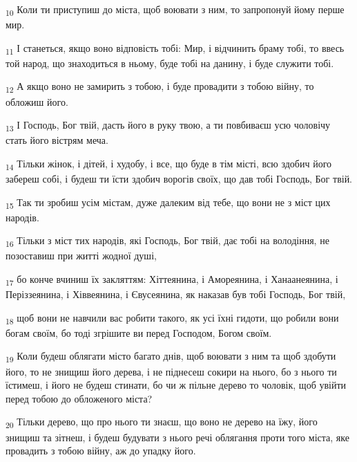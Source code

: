 \begin{tcolorbox}
\textsubscript{10} Коли ти приступиш до міста, щоб воювати з ним, то запропонуй йому перше мир.
\end{tcolorbox}
\begin{tcolorbox}
\textsubscript{11} І станеться, якщо воно відповість тобі: Мир, і відчинить браму тобі, то ввесь той народ, що знаходиться в ньому, буде тобі на данину, і буде служити тобі.
\end{tcolorbox}
\begin{tcolorbox}
\textsubscript{12} А якщо воно не замирить з тобою, і буде провадити з тобою війну, то обложиш його.
\end{tcolorbox}
\begin{tcolorbox}
\textsubscript{13} І Господь, Бог твій, дасть його в руку твою, а ти повбиваєш усю чоловічу стать його вістрям меча.
\end{tcolorbox}
\begin{tcolorbox}
\textsubscript{14} Тільки жінок, і дітей, і худобу, і все, що буде в тім місті, всю здобич його забереш собі, і будеш ти їсти здобич ворогів своїх, що дав тобі Господь, Бог твій.
\end{tcolorbox}
\begin{tcolorbox}
\textsubscript{15} Так ти зробиш усім містам, дуже далеким від тебе, що вони не з міст цих народів.
\end{tcolorbox}
\begin{tcolorbox}
\textsubscript{16} Тільки з міст тих народів, які Господь, Бог твій, дає тобі на володіння, не позоставиш при житті жодної душі,
\end{tcolorbox}
\begin{tcolorbox}
\textsubscript{17} бо конче вчиниш їх закляттям: Хіттеянина, і Амореянина, і Ханаанеянина, і Періззеянина, і Хіввеянина, і Євусеянина, як наказав був тобі Господь, Бог твій,
\end{tcolorbox}
\begin{tcolorbox}
\textsubscript{18} щоб вони не навчили вас робити такого, як усі їхні гидоти, що робили вони богам своїм, бо тоді згрішите ви перед Господом, Богом своїм.
\end{tcolorbox}
\begin{tcolorbox}
\textsubscript{19} Коли будеш облягати місто багато днів, щоб воювати з ним та щоб здобути його, то не знищиш його дерева, і не піднесеш сокири на нього, бо з нього ти їстимеш, і його не будеш стинати, бо чи ж пільне дерево то чоловік, щоб увійти перед тобою до обложеного міста?
\end{tcolorbox}
\begin{tcolorbox}
\textsubscript{20} Тільки дерево, що про нього ти знаєш, що воно не дерево на їжу, його знищиш та зітнеш, і будеш будувати з нього речі облягання проти того міста, яке провадить з тобою війну, аж до упадку його.
\end{tcolorbox}
